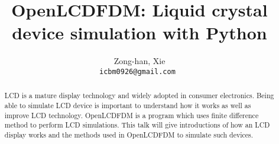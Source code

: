 \documentclass[a4paper]{article} %
\date{} %
\def\titulo#1{\title{#1}} %
\def\autores#1{\author{#1}} %
\begin{document}
\titulo{OpenLCDFDM: Liquid crystal device simulation with Python}

\autores{Zong-han, Xie \\
       \tt{icbm0926@gmail.com} %
       }%

\maketitle

\thispagestyle{empty}



\begin{abstract}
LCD is a mature display technology and widely adopted in consumer electronics. Being able to simulate LCD device is important to understand how it works as well as improve LCD technology. OpenLCDFDM is a program which uses finite difference method to perform LCD simulations. This talk will give introductions of how an LCD display works and the methods used in OpenLCDFDM to simulate such devices.
\end{abstract}
\end{document}
